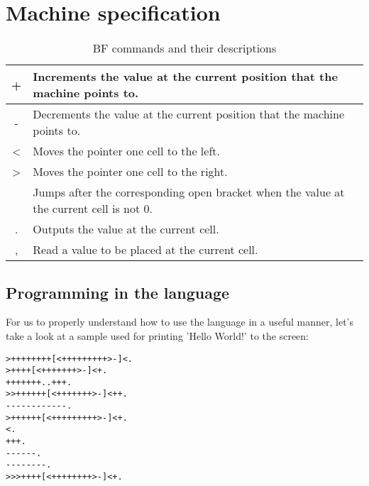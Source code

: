 \clearpage

\section{Machine specification}
\label{sec:ch2sec1}

\begin{table}[H]
\centering
\begin{tabularx}{\textwidth}{| c | Y |}
\hline
+ & Increments the value at the current position that the machine points to. \\ \hline
- & Decrements the value at the current position that the machine points to. \\ \hline
\textless & Moves the pointer one cell to the left.                                  \\ \hline
\textgreater & Moves the pointer one cell to the right.                                 \\  & Jumps after the corresponding open bracket when the value at the current cell is not 0.   \\ \hline
. & Outputs the value at the current cell. \\ \hline
, & Read a value to be placed at the current cell. \\ \hline
\end{tabularx}
\caption{BF commands and their descriptions}
\end{table}

\clearpage

\subsection{Programming in the language}
\label{sec:ch2sec1sub1}

\par For us to properly understand how to use the language in a useful manner, let's take a look at a sample used for printing 'Hello World!' to the screen:
\begin{verbatim}
>++++++++[<+++++++++>-]<.
>++++[<+++++++>-]<+.
+++++++..+++.
>>++++++[<+++++++>-]<++.
------------.
>++++++[<+++++++++>-]<+.
<.
+++.
------.
--------.
>>>++++[<++++++++>-]<+.
\end{verbatim}

